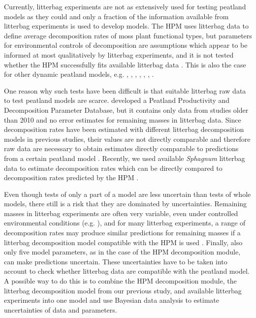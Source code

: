 \documentclass[esd, manuscript]{copernicus}
\begin{document}
Currently, litterbag experiments are not as extensively used for testing peatland models as they could and only a fraction of the information available from litterbag experiments is used to develop models. The HPM uses litterbag data to define average decomposition rates of moss plant functional types, but parameters for environmental controls of decomposition are assumptions which appear to be informed at most qualitatively by litterbag experiments, and it is not tested whether the HPM successfully fits available litterbag data \citep{Frolking.2010}. This is also the case for other dynamic peatland models, e.g. \citet{Frolking.2001}, \citet{Bauer.2004}, \citet{Heijmans.2008}, \citet{Heinemeyer.2010}, \citet{Morris.2012}, \citet{Chaudhary.2018}, \citet{Bona.2020}.

One reason why such tests have been difficult is that suitable litterbag raw data to test peatland models are scarce. \citet{Bona.2018} developed a Peatland Productivity and Decomposition Parameter Database, but it contains only data from studies older than 2010 and no error estimates for remaining masses in litterbag data. Since decomposition rates have been estimated with different litterbag decomposition models in previous studies, their values are not directly comparable and therefore raw data are necessary to obtain estimates directly comparable to predictions from a certain peatland model \citep{Yu.2001, Teickner.2024f}. Recently, we used available \emph{Sphagnum} litterbag data to estimate decomposition rates which can be directly compared to decomposition rates predicted by the HPM \citep{Teickner.2024f}.

Even though tests of only a part of a model are less uncertain than tests of whole models, there still is a risk that they are dominated by uncertainties. Remaining masses in litterbag experiments are often very variable, even under controlled environmental conditions (e.g. \citet{Bengtsson.2018}), and for many litterbag experiments, a range of decomposition rates may produce similar predictions for remaining masses if a litterbag decomposition model compatible with the HPM is used \citep{Teickner.2024f}. Finally, also only five model parameters, as in the case of the HPM decomposition module, can make predictions uncertain. These uncertainties have to be taken into account to check whether litterbag data are compatible with the peatland model. A possible way to do this is to combine the HPM decomposition module, the litterbag decomposition model from our previous study, and available litterbag experiments into one model and use Bayesian data analysis \citep{Gelman.2014} to estimate uncertainties of data and parameters.
\end{document}
